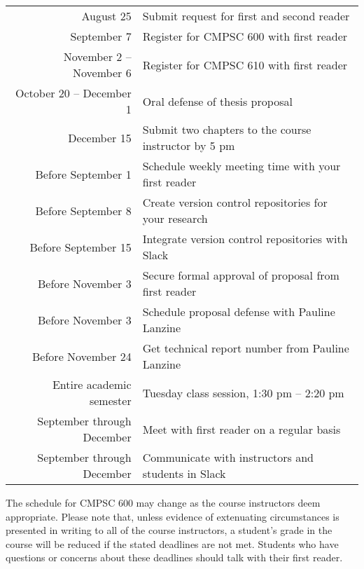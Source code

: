\begin{center}
\begin{tabular}{r|l}

\hline

August 25                & Submit request for first and second reader \\
September 7              & Register for CMPSC 600 with first reader \\
November 2 -- November 6 & Register for CMPSC 610 with first reader \\
October 20 -- December 1 & Oral defense of thesis proposal \\
December 15              & Submit two chapters to the course instructor by 5 pm \\

\hline

Before September 1  & Schedule weekly meeting time with your first reader \\
Before September 8  & Create version control repositories for your research \\
Before September 15 & Integrate version control repositories with Slack \\
Before November 3   & Secure formal approval of proposal from first reader \\
Before November 3   & Schedule proposal defense with Pauline Lanzine \\
Before November 24  & Get technical report number from Pauline Lanzine \\

\hline

Entire academic semester   & Tuesday class session, 1:30 pm -- 2:20 pm \\
September through December & Meet with first reader on a regular basis \\
September through December & Communicate with instructors and students in Slack \\

\hline

\end{tabular}
\end{center}

\noindent The schedule for CMPSC 600 may change as the course instructors deem appropriate. Please note that, unless
evidence of extenuating circumstances is presented in writing to all of the course instructors, a student's grade in the
course will be reduced if the stated deadlines are not met. Students who have questions or concerns about these
deadlines should talk with their first reader.

